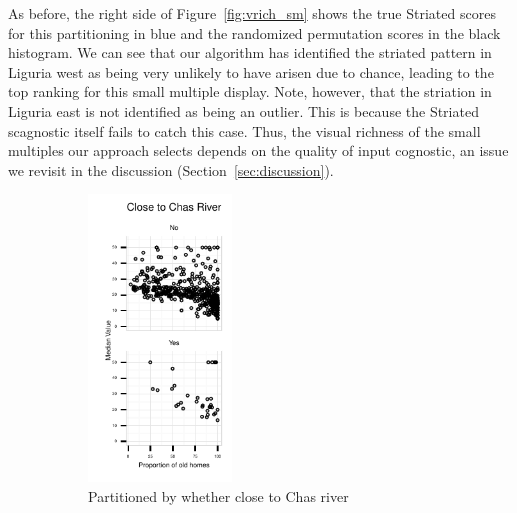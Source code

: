As before, the right side of Figure~\ref{fig:vrich_sm} shows the true Striated scores for this partitioning in blue and the randomized permutation scores in the black histogram. We can see that our algorithm has identified the striated pattern in Liguria west as being very unlikely to have arisen due to chance, leading to the top ranking for this small multiple display. 
Note, however, that the striation in Liguria east is not identified as being an outlier. This is because the Striated scagnostic itself fails to catch this case. Thus, the visual richness of the small multiples our approach selects depends on the quality of input cognostic, an issue we revisit in the discussion (Section~\ref{sec:discussion}).

\begin{figure}[t]
 \centering 
	 \begin{subfigure}[b]{1.5in}
        \centering
		\includegraphics[width=1.5in]{images/CHAS.pdf}
		  \caption{Partitioned by whether close to Chas river}
		 \label{fig:bostonClumpy}
	\end{subfigure}
	 \begin{subfigure}[b]{1.5in}

\end{subfigure}
\end{figure}
